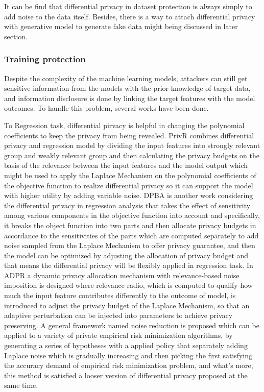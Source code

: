 \documentclass[conference]{IEEEtran}
\begin{document}
It can be find that differential privacy in dataset protection is always simply to add noise to the data itself. Besides, there is a way to attach differential privacy with generative model to generate fake data might being discussed in later section.

\subsubsection{Training protection}
Despite the complexity of the machine learning models, attackers can still get sensitive information from the models with the prior knowledge of target data, and information disclosure is done by linking the target features with the model outcomes. To handle this problem, several works have been done.

To Regression task, differential pirvacy is helpful in changing the polynomial coefficients to keep the privacy from being revealed. PrivR\cite{b11} combines differential privacy and regression model by dividing the input features into strongly relevant group and weakly relevant group and then calculating the privacy budgets on the basis of the relevance between the input features and the model output which might be used to apply the Laplace Mechanism on the polynomial coefficients of the objective function to realize differential privacy so it can support the model with higher utility by adding variable noise. DPBA\cite{b12} is another work considering the differential privacy in regression analysis that takes the effect of sensitivity among various components in the objective function into account and specifically, it breaks the object function into two parts and then allocate privacy budgets in accordance to the sensitivities of the parts which are computed separately to add noise sampled from the Laplace Mechanism to offer privacy guarantee, and then the model can be optimized by adjusting the allocation of privacy budget and that means the differential privacy will be flexibly applied in regression task. In ADPR\cite{b13} a dynamic privacy allocation mechanism with relevance-based noise imposition is designed where relevance radio, which is computed to qualify how much the input feature contributes differently to the outcome of model, is introduced to adjust the privacy budget of the Laplace Mechanism, so that an adaptive perturbation can be injected into parameters to achieve privacy preserving. A general framework named noise reduction\cite{b14} is proposed which can be applied to a variety of private empirical risk minimization algorithms, by generating a series of hypotheses with a applied policy that separately adding Laplace noise which is gradually increasing and then picking the first satisfying the accuracy demand of empirical risk minimization problem, and what's more, this method is satisfied a looser version of differential privacy proposed at the same time.
\end{document}
